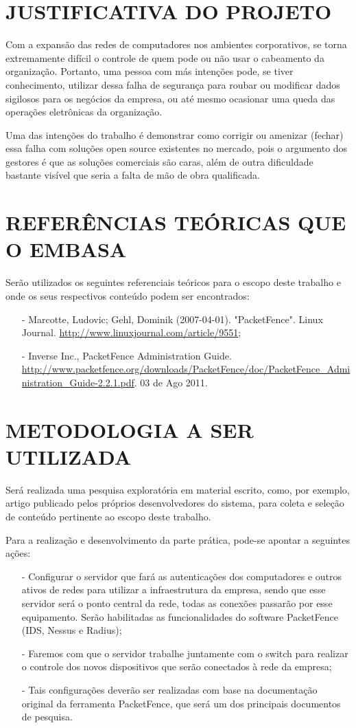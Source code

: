 \documentclass[brazil, ruledheader, pnumromarab,normaltoc]{abnt}
\begin{document}
\chapter{JUSTIFICATIVA DO PROJETO}
Com a expansão das redes de computadores nos ambientes corporativos, se torna extremamente difícil o controle de quem pode ou não usar o cabeamento da organização. Portanto, uma pessoa com más intenções pode, se tiver conhecimento, utilizar dessa falha de segurança para roubar ou modificar dados sigilosos para os negócios da empresa, ou até mesmo ocasionar uma queda das operações eletrônicas da organização.
\par
Uma das intenções do trabalho é demonstrar como corrigir ou amenizar (fechar) essa falha com soluções open source existentes no mercado, pois o argumento dos gestores é que as soluções comerciais são caras, além de outra dificuldade bastante visível que seria a falta de mão de obra qualificada.

\chapter{REFERÊNCIAS TEÓRICAS QUE O EMBASA}
Serão utilizados os seguintes referenciais teóricos para o escopo deste trabalho e onde os seus respectivos conteúdo podem ser encontrados:

\begin{enumerate}
\item[-]Marcotte, Ludovic; Gehl, Dominik (2007-04-01). "PacketFence". Linux Journal. \url{http://www.linuxjournal.com/article/9551};
\item[-]Inverse Inc., PacketFence Administration Guide. \url{http://www.packetfence.org/downloads/PacketFence/doc/PacketFence_Administration_Guide-2.2.1.pdf}. 03 de Ago 2011.
\end{enumerate}

\chapter{METODOLOGIA A SER UTILIZADA}
Será realizada uma pesquisa exploratória em material escrito, como, por exemplo, artigo publicado pelos próprios desenvolvedores do sistema, para coleta e seleção de conteúdo pertinente ao escopo deste trabalho.
\par
Para a realização e desenvolvimento da parte prática, pode-se apontar a seguintes ações:
\begin{enumerate}
\item[-]{Configurar o servidor que fará as autenticações dos computadores e outros ativos de redes para utilizar a infraestrutura da empresa, sendo que esse servidor será o ponto central da rede, todas as conexões passarão por esse equipamento. Serão habilitadas as funcionalidades do software PacketFence (IDS, Nessus e Radius);}
\item[-]{Faremos com que o servidor trabalhe juntamente com o switch para realizar o controle dos novos dispositivos que serão conectados à rede da empresa;}
\item[-]{Tais configurações deverão ser realizadas com base na documentação original da ferramenta PacketFence, que será um dos principais documentos de pesquisa.}
\end{enumerate}
\end{document}
